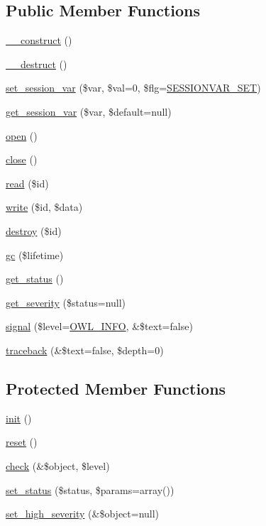 \subsection*{Public Member Functions}
\begin{DoxyCompactItemize}
\item 
\hyperlink{classSession_a36373ba15d6c8f932aeea02d7320d7c8}{\_\-\_\-construct} ()
\item 
\hyperlink{classSession_aa498272c85524e4700abc3363883165b}{\_\-\_\-destruct} ()
\item 
\hyperlink{classSession_a178a3aa14d421509658f465b0b6bd398}{set\_\-session\_\-var} (\$var, \$val=0, \$flg=\hyperlink{class_8sessionhandler_8php_af9e860b1663497a46177b0ec35d6a9f5}{SESSIONVAR\_\-SET})
\item 
\hyperlink{classSession_a5848ed72d1718b1e4fd11e66972e88bc}{get\_\-session\_\-var} (\$var, \$default=null)
\item 
\hyperlink{classSessionHandler_a50aa0b123f53d99de350a0eb02b4bfa5}{open} ()
\item 
\hyperlink{classSessionHandler_a335ced83731c7e3e685b7e0df2989c79}{close} ()
\item 
\hyperlink{classSessionHandler_a58cc3e5bf5b14e7bfbc73162de1f5d2b}{read} (\$id)
\item 
\hyperlink{classSessionHandler_ab59071ef0d3deee2472c6916471bd9f5}{write} (\$id, \$data)
\item 
\hyperlink{classSessionHandler_a4e43712ef307979de1b12039ef801adb}{destroy} (\$id)
\item 
\hyperlink{classSessionHandler_ac33097332375ae3f8a43c31cef6db0e8}{gc} (\$lifetime)
\item 
\hyperlink{class__OWL_a99ec771fa2c5c279f80152cc09e489a8}{get\_\-status} ()
\item 
\hyperlink{class__OWL_adf9509ef96858be7bdd9414c5ef129aa}{get\_\-severity} (\$status=null)
\item 
\hyperlink{class__OWL_a51ba4a16409acf2a2f61f286939091a5}{signal} (\$level=\hyperlink{owl_8severitycodes_8php_a139328861128689f2f4def6a399d9057}{OWL\_\-INFO}, \&\$text=false)
\item 
\hyperlink{class__OWL_aa29547995d6741b7d2b90c1d4ea99a13}{traceback} (\&\$text=false, \$depth=0)
\end{DoxyCompactItemize}
\subsection*{Protected Member Functions}
\begin{DoxyCompactItemize}
\item 
\hyperlink{class__OWL_ae0ef3ded56e8a6b34b6461e5a721cd3e}{init} ()
\item 
\hyperlink{class__OWL_a2f2a042bcf31965194c03033df0edc9b}{reset} ()
\item 
\hyperlink{class__OWL_ad6f4f6946f40199dd0333cf219fa500e}{check} (\&\$object, \$level)
\item 
\hyperlink{class__OWL_aea912d0ede9b3c2a69b79072d94d4787}{set\_\-status} (\$status, \$params=array())
\item 
\hyperlink{class__OWL_a576829692a3b66e3d518853bf43abae3}{set\_\-high\_\-severity} (\&\$object=null)
\end{DoxyCompactItemize}
